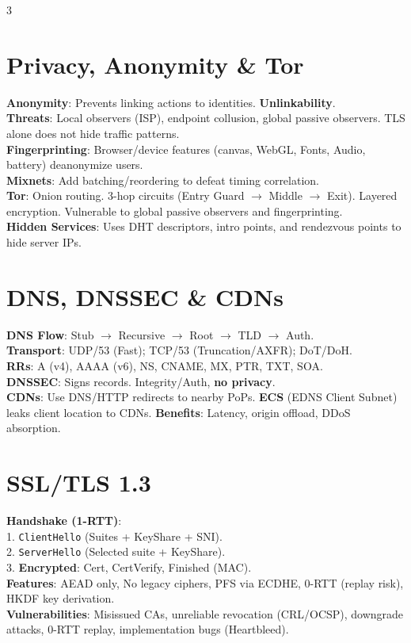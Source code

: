 \documentclass[10pt,landscape]{article}
\begin{document}
\begin{multicols*}{3}
\section*{Privacy, Anonymity \& Tor}
\textbf{Anonymity}: Prevents linking actions to identities. \textbf{Unlinkability}. \\
\textbf{Threats}: Local observers (ISP), endpoint collusion, global passive observers. TLS alone does not hide traffic patterns. \\
\textbf{Fingerprinting}: Browser/device features (canvas, WebGL, Fonts, Audio, battery) deanonymize users. \\
\textbf{Mixnets}: Add batching/reordering to defeat timing correlation. \\
\textbf{Tor}: Onion routing. 3-hop circuits (Entry Guard $\to$ Middle $\to$ Exit). Layered encryption. Vulnerable to global passive observers and fingerprinting. \\
\textbf{Hidden Services}: Uses DHT descriptors, intro points, and rendezvous points to hide server IPs.

\section*{DNS, DNSSEC \& CDNs}
\textbf{DNS Flow}: Stub $\to$ Recursive $\to$ Root $\to$ TLD $\to$ Auth. \\
\textbf{Transport}: UDP/53 (Fast); TCP/53 (Truncation/AXFR); DoT/DoH. \\
\textbf{RRs}: A (v4), AAAA (v6), NS, CNAME, MX, PTR, TXT, SOA. \\
\textbf{DNSSEC}: Signs records. Integrity/Auth, \textbf{no privacy}. \\
\textbf{CDNs}: Use DNS/HTTP redirects to nearby PoPs. \textbf{ECS} (EDNS Client Subnet) leaks client location to CDNs. \textbf{Benefits}: Latency, origin offload, DDoS absorption.

\section*{SSL/TLS 1.3}
\textbf{Handshake (1-RTT)}: \\
1. \texttt{ClientHello} (Suites + KeyShare + SNI). \\
2. \texttt{ServerHello} (Selected suite + KeyShare). \\
3. \textbf{Encrypted}: Cert, CertVerify, Finished (MAC). \\
\textbf{Features}: AEAD only, No legacy ciphers, PFS via ECDHE, 0-RTT (replay risk), HKDF key derivation. \\
\textbf{Vulnerabilities}: Misissued CAs, unreliable revocation (CRL/OCSP), downgrade attacks, 0-RTT replay, implementation bugs (Heartbleed).


\end{multicols*}
\end{document}
